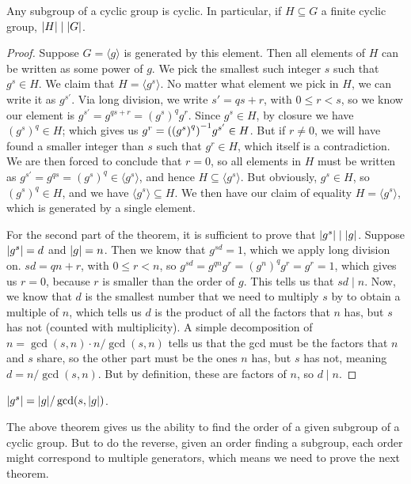 \begin{theorem}\label{thm:cyclic-subgroup}
    Any subgroup of a cyclic group is cyclic.
    In particular, if \(H \subseteq G\) a finite cyclic group,
    \(\abs{H} \mid \abs{G}\).
\end{theorem}
\begin{proof}
    Suppose \(G = \langle g \rangle\) is generated by this element.
    Then all elements of \(H\) can be written as some power of \(g\).
    We pick the smallest such integer \(s\) such that \(g^s \in H\).
    We claim that \(H = \langle g^s \rangle\).
    No matter what element we pick in \(H\),
    we can write it as \(g^{s'}\).
    Via long division, we write \(s' = qs + r\), with \(0 \leq r < s\),
    so we know our element is
    \(g^{s'} = g^{qs+r} = {(g^s)}^q g^r\).
    Since \(g^s \in H\), by closure we have \({(g^s)}^q \in H\);
    which gives us \(g^r = {\qty({(g^s)}^q)}^{-1} g^{s'} \in H\).
    But if \(r \neq 0\),
    we will have found a smaller integer than \(s\)
    such that \(g^r \in H\),
    which itself is a contradiction.
    We are then forced to conclude that \(r = 0\),
    so all elements in \(H\) must be written as
    \(g^{s'} = g^{qs} = {(g^s)}^q \in \langle g^s \rangle\),
    and hence \(H \subseteq \langle g^s \rangle\).
    But obviously, \(g^s \in H\), so \({(g^s)}^q \in H\),
    and we have \(\langle g^s \rangle \subseteq H\).
    We then have our claim of equality \(H = \langle g^s \rangle\),
    which is generated by a single element.

    For the second part of the theorem,
    it is sufficient to prove that \(\abs{g^s} \mid \abs{g}\).
    Suppose \(\abs{g^s} = d\) and \(\abs{g} = n\).
    Then we know that \(g^{sd} = 1\), which we apply long division on.
    \(sd = qn + r\), with \(0 \leq r < n\),
    so \(g^{sd} = g^{qn}g^r = {(g^n)}^q g^r = g^r = 1\),
    which gives us \(r = 0\),
    because \(r\) is smaller than the order of \(g\).
    This tells us that \(sd \mid n\).
    Now, we know that \(d\) is the smallest number
    that we need to multiply \(s\) by to obtain a multiple of \(n\),
    which tells us \(d\) is the product of
    all the factors that \(n\) has,
    but \(s\) has not (counted with multiplicity).
    A simple decomposition of \(n = \gcd(s,n) \cdot n/\gcd(s,n)\)
    tells us that the gcd must be the factors that \(n\) and \(s\) share,
    so the other part must be the ones \(n\) has, but \(s\) has not,
    meaning \(d = n/\gcd(s,n)\).
    But by definition, these are factors of \(n\),
    so \(d \mid n\).
\end{proof}
\begin{corollary}
    \(\abs{g^s} = \abs{g}/\gcd(s,\abs{g})\).
\end{corollary}
\begin{remark}
    The above theorem gives us the ability to
    find the order of a given subgroup of a cyclic group.
    But to do the reverse, given an order finding a subgroup,
    each order might correspond to multiple generators,
    which means we need to prove the next theorem.
\end{remark}

